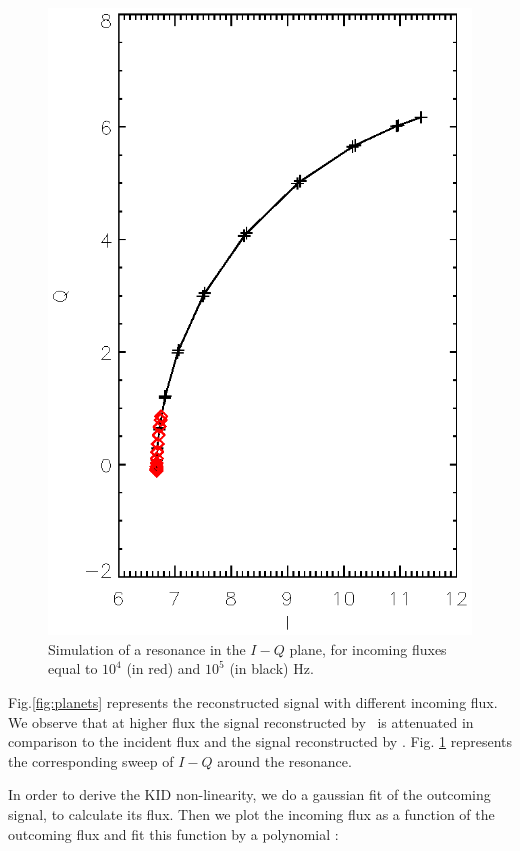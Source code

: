 \begin{figure}[h]
\center
\includegraphics[clip, angle=0, width=\columnwidth]{Figures/resonance.eps}
\caption{Simulation of a resonance in the $I-Q$ plane, for incoming fluxes equal to $10^{4}$ (in red) and $10^{5}$ (in black) Hz.}
\label{fig:resonance}
\end{figure}

Fig.\ref{fig:planets} represents the reconstructed signal with different incoming flux. 
We observe that at higher flux the signal reconstructed by \rf\ is attenuated in comparison to the incident flux and the signal reconstructed by \cf . Fig. \ref{fig:resonance} represents the corresponding sweep of $I-Q$ around the resonance.

In order to derive the KID non-linearity, we do a gaussian fit of the outcoming signal, to calculate its flux. Then we plot the incoming flux as a function of the outcoming flux and fit this function by a polynomial :

